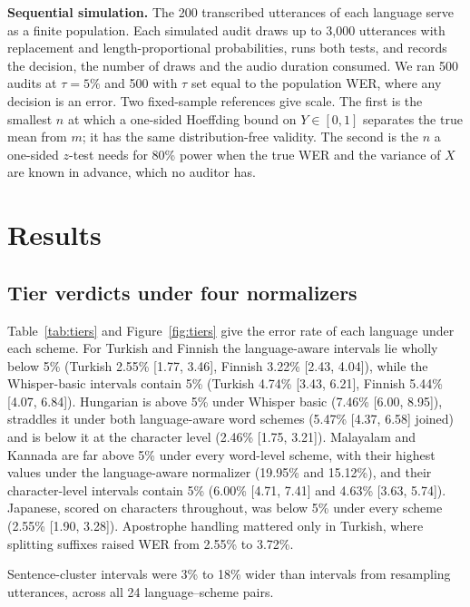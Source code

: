 \textbf{Sequential simulation.} The 200 transcribed utterances of each language serve as a finite population. Each simulated audit draws up to 3{,}000 utterances with replacement and length-proportional probabilities, runs both tests, and records the decision, the number of draws and the audio duration consumed. We ran 500 audits at $\tau = 5\%$ and 500 with $\tau$ set equal to the population WER, where any decision is an error. Two fixed-sample references give scale. The first is the smallest $n$ at which a one-sided Hoeffding bound on $Y \in [0,1]$ separates the true mean from $m$; it has the same distribution-free validity. The second is the $n$ a one-sided $z$-test needs for 80\% power when the true WER and the variance of $X$ are known in advance, which no auditor has.

\section{Results}
\label{sec:results}

\subsection{Tier verdicts under four normalizers}
\label{sec:results-tiers}

Table~\ref{tab:tiers} and Figure~\ref{fig:tiers} give the error rate of each language under each scheme. For Turkish and Finnish the language-aware intervals lie wholly below 5\% (Turkish 2.55\% [1.77, 3.46], Finnish 3.22\% [2.43, 4.04]), while the Whisper-basic intervals contain 5\% (Turkish 4.74\% [3.43, 6.21], Finnish 5.44\% [4.07, 6.84]). Hungarian is above 5\% under Whisper basic (7.46\% [6.00, 8.95]), straddles it under both language-aware word schemes (5.47\% [4.37, 6.58] joined) and is below it at the character level (2.46\% [1.75, 3.21]). Malayalam and Kannada are far above 5\% under every word-level scheme, with their highest values under the language-aware normalizer (19.95\% and 15.12\%), and their character-level intervals contain 5\% (6.00\% [4.71, 7.41] and 4.63\% [3.63, 5.74]). Japanese, scored on characters throughout, was below 5\% under every scheme (2.55\% [1.90, 3.28]). Apostrophe handling mattered only in Turkish, where splitting suffixes raised WER from 2.55\% to 3.72\%.

Sentence-cluster intervals were 3\% to 18\% wider than intervals from resampling utterances, across all 24 language--scheme pairs.

